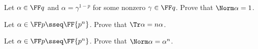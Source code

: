 \documentclass{article}
\begin{document}
\begin{subexercise}
Let \( \alpha\in\FF q \) and \( \alpha=\gamma^{1-p} \) for some nonzero \( \gamma\in\FF q \).
Prove that \( \Norm \alpha = 1 \).
\end{subexercise}
\begin{solution}

\end{solution}
\pagebreak

\begin{subexercise}
  Let \( \alpha\in\FF p \sseq \FF{p^n} \).
  Prove that \( \Tr \alpha = n\alpha \).
\end{subexercise}
\begin{solution}

\end{solution}
\pagebreak

\begin{subexercise}
  Let \( \alpha\in\FF p \sseq \FF{p^n} \).
  Prove that \( \Norm \alpha = \alpha^n \).
\end{subexercise}
\begin{solution}

\end{solution}
\end{document}
